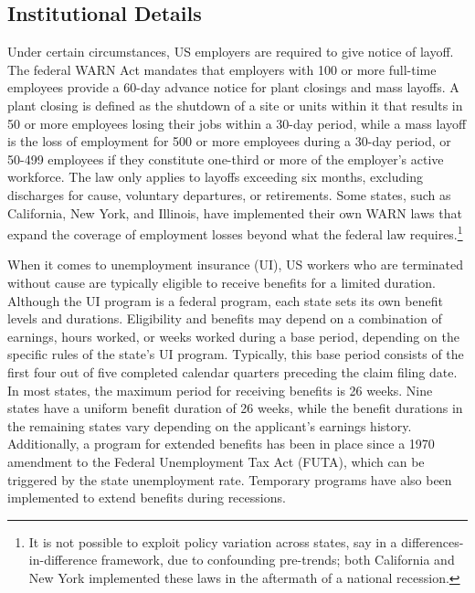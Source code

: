 \documentclass{div}
\begin{document}

\subsection{Institutional Details}

Under certain circumstances, US employers are required to give notice of layoff. The federal WARN Act mandates that employers with 100 or more full-time employees provide a 60-day advance notice for plant closings and mass layoffs. A plant closing is defined as the shutdown of a site or units within it that results in 50 or more employees losing their jobs within a 30-day period, while a mass layoff is the loss of employment for 500 or more employees during a 30-day period, or 50-499 employees if they constitute one-third or more of the employer's active workforce. The law only applies to layoffs exceeding six months, excluding discharges for cause, voluntary departures, or retirements. Some states, such as California, New York, and Illinois, have implemented their own WARN laws that expand the coverage of employment losses beyond what the federal law requires.\footnote{It is not possible to exploit policy variation across states, say in a differences-in-difference framework, due to confounding pre-trends; both California and New York implemented these laws in the aftermath of a national recession.}

When it comes to unemployment insurance (UI), US workers who are terminated without cause are typically eligible to receive benefits for a limited duration. Although the UI program is a federal program, each state sets its own benefit levels and durations. Eligibility and benefits may depend on a combination of earnings, hours worked, or weeks worked during a base period, depending on the specific rules of the state's UI program. Typically, this base period consists of the first four out of five completed calendar quarters preceding the claim filing date. In most states, the maximum period for receiving benefits is 26 weeks. Nine states have a uniform benefit duration of 26 weeks, while the benefit durations in the remaining states vary depending on the applicant's earnings history. Additionally, a program for extended benefits has been in place since a 1970 amendment to the Federal Unemployment Tax Act (FUTA), which can be triggered by the state unemployment rate. Temporary programs have also been implemented to extend benefits during recessions.

\end{document}
